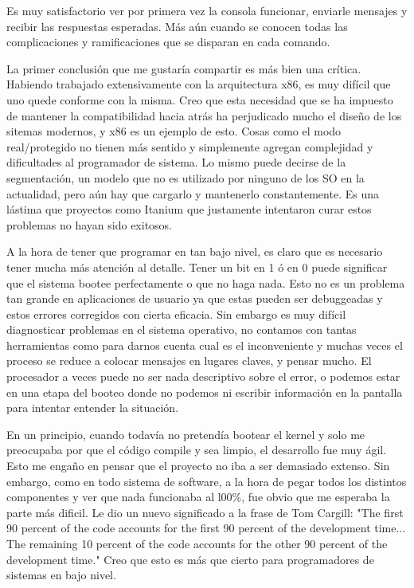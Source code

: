Es muy satisfactorio ver por primera vez la consola funcionar, enviarle
mensajes y recibir las respuestas esperadas. Más aún cuando se conocen todas
las complicaciones y ramificaciones que se disparan en cada comando.

La primer conclusión que me gustaría compartir es más bien una crítica.
Habiendo trabajado extensivamente con la arquitectura x86, es muy difícil que
uno quede conforme con la misma. Creo que esta necesidad que se ha impuesto de
mantener la compatibilidad hacia atrás ha perjudicado mucho el diseño de los
sitemas modernos, y x86 es un ejemplo de esto. Cosas como el modo
real/protegido no tienen más sentido y simplemente agregan complejidad y
dificultades al programador de sistema. Lo mismo puede decirse de la
segmentación, un modelo que no es utilizado por ninguno de los SO en la
actualidad, pero aún hay que cargarlo y mantenerlo constantemente. Es una
lástima que proyectos como Itanium que justamente intentaron curar estos
problemas no hayan sido exitosos.

A la hora de tener que programar en tan bajo nivel, es claro que es necesario
tener mucha más atención al detalle. Tener un bit en 1 ó en 0 puede significar
que el sistema bootee perfectamente o que no haga nada. Esto no es un problema
tan grande en aplicaciones de usuario ya que estas pueden ser debuggeadas y
estos errores corregidos con cierta eficacia. Sin embargo es muy difícil
diagnosticar problemas en el sistema operativo, no contamos con tantas
herramientas como para darnos cuenta cual es el inconveniente y muchas veces el
proceso se reduce a colocar mensajes en lugares claves, y pensar mucho. El
procesador a veces puede no ser nada descriptivo sobre el error, o podemos
estar en una etapa del booteo donde no podemos ni escribir información en la
pantalla para intentar entender la situación.

En un principio, cuando todavía no pretendía bootear el kernel y solo me
preocupaba por que el código compile y sea limpio, el desarrollo fue muy ágil.
Esto me engaño en pensar que el proyecto no iba a ser demasiado extenso. Sin
embargo, como en todo sistema de software, a la hora de pegar todos los
distintos componentes y ver que nada funcionaba al l00\%, fue obvio que me
esperaba la parte más dificil. Le dio un nuevo significado a la frase de Tom
Cargill: "The first 90 percent of the code accounts for the first 90 percent
of the development time... The remaining 10 percent of the code accounts for the
other 90 percent of the development time." Creo que esto es más que cierto para
programadores de sistemas en bajo nivel.

